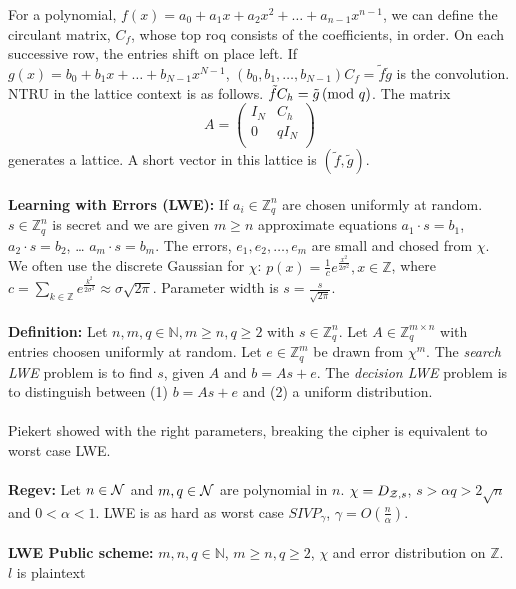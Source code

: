 For a polynomial, $f(x) = a_0 + a_1 x + a_2 x^2 + \ldots + a_{n-1} x^{n-1}$, we can define the circulant matrix,
$C_f$, whose top roq consists of the coefficients, in order.  On each successive row, the entries shift on place left.
If $g(x) = b_0 + b_ 1 x + \ldots + b_{N-1} x^{N-1}$, $(b_0, b_1, \ldots , b_{N-1}) C_f = \tilde{f} \tilde{g}$ is the convolution.
NTRU in the lattice context is as follows. $\tilde{f}C_h = \tilde{g} \thinspace \textnormal{(mod } q \textnormal{)}$.  The matrix
$$
A=
\left(
\begin{array}{cc}
I_N & C_h \\
0 & q I_N \\
\end{array}
\right)
$$
generates a lattice.
A short vector in this lattice is $(\tilde{f}, \tilde{g})$.
\\
\\
{\bf Learning with Errors (LWE): }  If $a_i \in {\mathbb Z}_q^n$ are chosen uniformly at random.
$s \in {\mathbb Z}_q^n$ is secret and we are given $m \geq n$ approximate equations
$a_1 \cdot s = b_1$,
$a_2 \cdot s = b_2$,
\ldots
$a_m \cdot s = b_m$.  The errors, $e_1, e_2, \ldots, e_m$ are small and chosed from $\chi$.
We often use the discrete Gaussian for $\chi$: $p(x) = {\frac 1 c} e^{\frac {x^2}{2 \sigma^2}}, x \in {\mathbb Z}$,
where $c = \sum_{k \in {\mathbb Z}} e^{\frac {k^2}{2 \sigma^2}} \approx \sigma \sqrt{2 \pi}$.  Parameter width is
$s = {\frac {s} {\sqrt{2 \pi}}}$.
\\
\\
{\bf Definition: } Let $n, m, q \in {\mathbb N}, m \geq n, q \geq 2$ with 
$s \in {\mathbb Z}_q^n$.  Let $A \in {\mathbb Z}_q^{m \times n}$ with entries choosen uniformly at random.
Let $e \in {\mathbb Z}_q^m$ be drawn from $\chi^m$.
The \emph{search LWE} problem is to find $s$, given $A$ and $b =As+e$.
The \emph{decision LWE} problem is to distinguish between (1) $b = As +e$ and (2) a uniform distribution.
\\
\\
Piekert showed with the right parameters, breaking the cipher is equivalent to worst case LWE.\\
\\
{\bf Regev:} Let $n \in {\cal N}$ and $m, q \in {\cal N}$ are polynomial in $n$.  $\chi = D_{{\cal Z}, s}$,
$s > \alpha q > 2 \sqrt{n}$ and $0 < \alpha < 1$.  LWE is as hard as worst case $SIVP_{\gamma}$, $\gamma = O({\frac n {\alpha}})$.
\\
\\
{\bf LWE Public scheme: }
$m,n,q \in {\mathbb N}$, $m \geq n, q \geq 2$, $\chi$ and error distribution on ${\mathbb Z}$.  $l$ is plaintext
